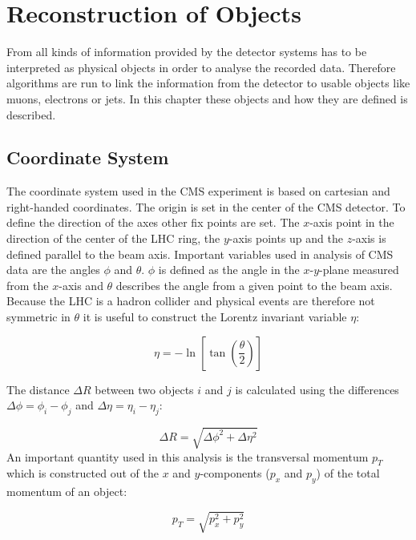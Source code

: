 \chapter{Reconstruction of Objects}
	From all kinds of information provided by the detector systems has to be interpreted as physical objects in order to analyse the recorded data. Therefore algorithms are run to link the information from the detector to usable objects like muons, electrons or jets. In this chapter these objects and how they are defined is described. 
\section{Coordinate System}
	The coordinate system used in the CMS experiment is based on cartesian and right-handed coordinates. The origin is set in the center of the CMS detector. To define the direction of the axes other fix points are set. The $x$-axis point in the direction of the center of the LHC ring, the $y$-axis points up and the $z$-axis is defined parallel to the beam axis. Important variables used in analysis of CMS data are the angles $\phi$ and $\theta$. $\phi$ is defined as the angle in the $x$-$y$-plane measured from the $x$-axis and $\theta$ describes the angle from a given point to the beam axis. Because the LHC is a hadron collider and physical events are therefore not symmetric in $\theta$ it is useful to construct the Lorentz invariant variable $\eta$:
	
	\begin{equation}
	\eta = - \ln \left[\tan\left( \frac{\theta}{2}\right) \right]
	\end{equation} 

	\noindent The distance $\Delta R$ between two objects $i$ and $j$ is calculated using the differences $\Delta \phi = \phi_i - \phi_j$ and $\Delta \eta = \eta_i - \eta_j$:
	
	\begin{equation}
	\Delta R = \sqrt{\Delta \phi ^2 + \Delta \eta ^2}
	\end{equation}
	\noindent An important quantity used in this analysis is the transversal momentum $p_T$ which is constructed out of the $x$ and $y$-components ($p_x$ and $p_y$) of the total momentum of an object:
	
	\begin{equation}
	p_T = \sqrt{p_x^2 + p_y^2}
	\end{equation} 

